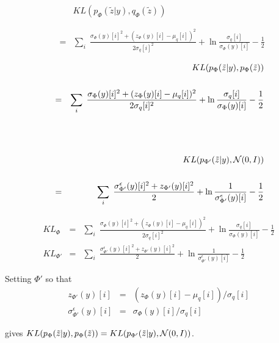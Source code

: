 {

\begin{eqnarray*}
& & KL(p_\Phi(\tilde{z}|y),q_\Phi(\tilde{z})) \\
\\
\\
& = & \sum_i \;\frac{\sigma_\Phi(y)[i]^2 + (z_\Phi(y)[i]-\mu_q[i])^2}{2 \sigma_q[i]^2}
+ \ln\frac{\sigma_q[i]}{\sigma_\Phi(y)[i]} - \frac{1}{2}
\end{eqnarray*}



\begin{eqnarray*}
 &  & KL(p_\Phi(\tilde{z}|y),p_\Phi(\tilde{z})) \\
 \\
 & = & \sum_i \;\frac{ \sigma_\Phi(y)[i]^2 +(z_\Phi(y)[i] - \mu_q[i])^2}{2\sigma_q[i]^2}
+ \ln\frac{\sigma_q[i]}{\sigma_\Phi(y)[i]}
- \frac{1}{2}
\\
\\
\\
\\
 &  & KL(p_{\Phi'}(\tilde{z}|y),{\cal N}(0,I)) \\
 \\
 & = & \sum_i \;\frac{\sigma^\epsilon_{\Phi'}(y)[i]^2 +z_{\Phi'}(y)[i]^2}{2} + \ln\frac{1}{\sigma^\epsilon_{\Phi'}(y)[i]} - \frac{1}{2}
\end{eqnarray*}


\begin{eqnarray*}
KL_\Phi & = & \sum_i \;\frac{ \sigma_\Phi(y)[i]^2 +(z_\Phi(y)[i] - \mu_q[i])^2}{2\sigma_q[i]^2}
+ \ln\frac{\sigma_q[i]}{\sigma_\Phi(y)[i]} - \frac{1}{2}
\\
KL_{\Phi'} & = & \sum_i \;\frac{\sigma^\epsilon_{\Phi'}(y)[i]^2 +z_{\Phi'}(y)[i]^2}{2} + \ln\frac{1}{\sigma^\epsilon_{\Phi'}(y)[i]} - \frac{1}{2}
\end{eqnarray*}

Setting $\Phi'$ so that
\begin{eqnarray*}
z_{\Phi'}(y)[i] & = & (z_\Phi(y)[i] - \mu_q[i])/\sigma_q[i] \\
\sigma^\epsilon_{\Phi'}(y)[i] & = & \sigma_\Phi(y)[i]/\sigma_q[i]
\end{eqnarray*}

\vfill
gives {\color{red} $KL(p_{\Phi}(\tilde{z}|y),p_\Phi(\tilde{z})) = KL(p_{\Phi'}(\tilde{z}|y),{\cal N}(0,I))$}.


}
